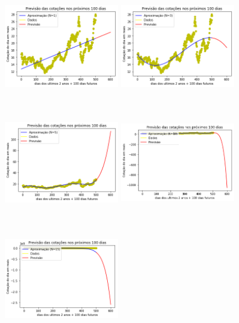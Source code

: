 \documentclass{article}
\begin{document}
\begin{figure}[!htb]
\includegraphics [width=5cm,height=5cm]{PrevisaoG/P1.png}
\includegraphics [width=5cm,height=5cm]{PrevisaoG/P3.png}
\includegraphics [width=5cm,height=5cm]{PrevisaoG/P5.png}
\includegraphics [width=5cm,height=5cm]{PrevisaoG/P10.png}
\includegraphics [width=5cm,height=5cm]{PrevisaoG/P15.png}

\end{figure}
\end{document}
